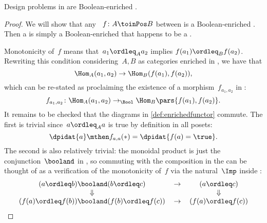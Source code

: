 \begin{proposition}
    Design problems in \DP are Boolean-enriched .
\end{proposition}
\begin{proof}
    We will show that any ~$f\colon A \toinPos B$ between  is a Boolean-enriched .
    Then a  is simply a Boolean-enriched  that happens to be a .

    Monotonicity of~$f$ means that~$a_1 \ordleq_A a_2$ implies $f(a_1) \ordleq_B f(a_2)$.
    Rewriting this condition considering~$A, B$ as categories enriched in \Bool, we have that
    \begin{equation}
        \Hom_A(a_1, a_2) \to \Hom_B(f(a_1), f(a_2)),
    \end{equation}
    which can be re-stated as proclaiming the existence of a morphism~$f_{a_1, a_2}$ in \Bool:
    \begin{equation}
        f_{a_1, a_2} \colon \Hom_A(a_1, a_2) \to_{\Bool} \Hom_B\pars{f(a_1), f(a_2)}.
    \end{equation}
    It remains to be checked that the diagrams in \cref{def:enrichedfunctor} commute.
    The first is trivial since~$a \ordleq_A a$ is true by definition in all posets:
    \begin{equation}
        \dpidat{a} \mthen f_{a,a} (\ast) = \dpidat{f(a) = \true}.
    \end{equation}
    The second is also relatively trivial: the monoidal product is just the conjunction~$\booland$ in \Bool, so commuting with the composition in the  can be thought of as a verification of the monotonicity of~$f$ via the natural~$\Imp$ inside \Bool:
    \begin{equation}
        \begin{tabular}{ccc}
            $(a \ordleq b) \booland (b \ordleq c)$             & $\to$ & $(a \ordleq c)$ \\
            $\Downarrow$                                       &       & $\Downarrow$ \\
            $(f(a) \ordleq f(b)) \booland (f(b) \ordleq f(c))$ & $\to$ & $(f(a) \ordleq f(c))$
        \end{tabular}
    \end{equation}
\end{proof}

